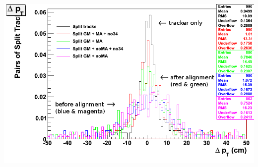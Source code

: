 \documentclass[compress]{beamer}
\begin{document}
\begin{frame}
\begin{columns}
\includegraphics[width=\linewidth]{plots_dpt.png}
\end{columns}
\end{frame}
\end{document}
